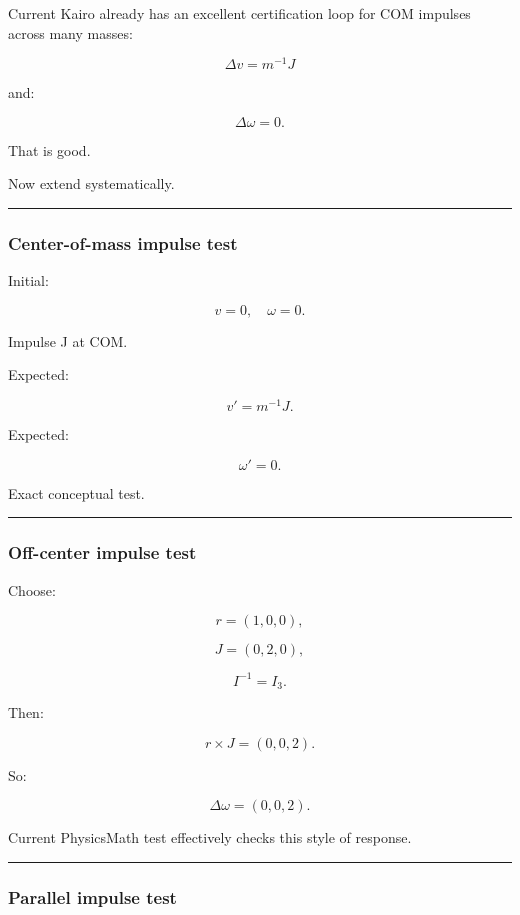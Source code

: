 Current Kairo already has an excellent certification loop for COM impulses across many masses:

\[
\Delta v
=
m^{-1}J
\]

and:

\[
\Delta\omega=0.
\]

That is good.

Now extend systematically.

\begin{center}\rule{0.5\linewidth}{0.5pt}\end{center}

\subsubsection{Center-of-mass impulse test}\label{center-of-mass-impulse-test}

Initial:

\[
v=0,
\quad
\omega=0.
\]

Impulse J at COM.

Expected:

\[
v'=m^{-1}J.
\]

Expected:

\[
\omega'=0.
\]

Exact conceptual test.

\begin{center}\rule{0.5\linewidth}{0.5pt}\end{center}

\subsubsection{Off-center impulse test}\label{off-center-impulse-test}

Choose:

\[
r=(1,0,0),
\]

\[
J=(0,2,0),
\]

\[
I^{-1}=I_3.
\]

Then:

\[
r\times J
=
(0,0,2).
\]

So:

\[
\Delta\omega=(0,0,2).
\]

Current PhysicsMath test effectively checks this style of response.

\begin{center}\rule{0.5\linewidth}{0.5pt}\end{center}

\subsubsection{Parallel impulse test}\label{parallel-impulse-test}

